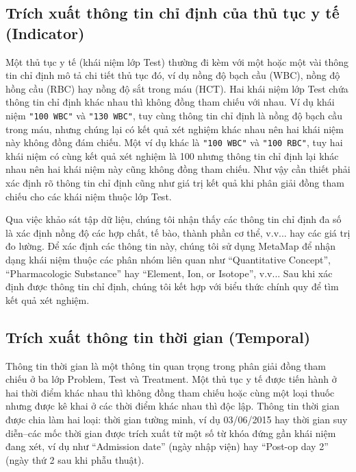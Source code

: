 \subsection*{Trích xuất thông tin chỉ định của thủ tục y tế (Indicator)}
Một thủ tục y tế (khái niệm lớp Test) thường đi kèm với một hoặc một vài thông tin chỉ định mô tả chi tiết thủ tục đó, ví dụ nồng độ bạch cầu (WBC), nồng độ hồng cầu (RBC) hay nồng độ sắt trong máu (HCT). Hai khái niệm lớp Test chứa thông tin chỉ định khác nhau thì không đồng tham chiếu với nhau. Ví dụ khái niệm \texttt{"100 WBC"} và \texttt{"130 WBC"}, tuy cùng thông tin chỉ định là nồng độ bạch cầu trong máu, nhưng chúng lại có kết quả xét nghiệm khác nhau nên hai khái niệm này không đồng đám chiếu. Một ví dụ khác là \texttt{"100 WBC"} và \texttt{"100 RBC"}, tuy hai khái niệm có cùng kết quả xét nghiệm là 100 nhưng thông tin chỉ định lại khác nhau nên hai khái niệm này cũng không đồng tham chiếu. Như vậy cần thiết phải xác định rõ thông tin chỉ định cũng như giá trị kết quả khi phân giải đồng tham chiếu cho các khái niệm thuộc lớp Test.

Qua việc khảo sát tập dữ liệu, chúng tôi nhận thấy các thông tin chỉ định đa số là xác định nồng độ các hợp chất, tế bào, thành phần cơ thể, v.v... hay các giá trị đo lường. Để xác định các thông tin này, chúng tôi sử dụng MetaMap để nhận dạng khái niệm thuộc các phân nhóm liên quan như ``Quantitative Concept'', ``Pharmacologic Substance'' hay ``Element, Ion, or Isotope'', v.v... Sau khi xác định được thông tin chỉ định, chúng tôi kết hợp với biểu thức chính quy để tìm kết quả xét nghiệm.

\subsection*{Trích xuất thông tin thời gian (Temporal)}
Thông tin thời gian là một thông tin quan trọng trong phân giải đồng tham chiếu ở ba lớp Problem, Test và Treatment. Một thủ tục y tế được tiến hành ở hai thời điểm khác nhau thì không đồng tham chiếu hoặc cùng một loại thuốc nhưng được kê khai ở các thời điểm khác nhau thì độc lập. Thông tin thời gian được chia làm hai loại: thời gian tường minh, ví dụ 03/06/2015 hay thời gian suy diễn--các mốc thời gian được trích xuất từ một số từ khóa đứng gần khái niệm đang xét, ví dụ như ``Admission date'' (ngày nhập viện) hay ``Post-op day 2'' (ngày thứ 2 sau khi phẫu thuật).

